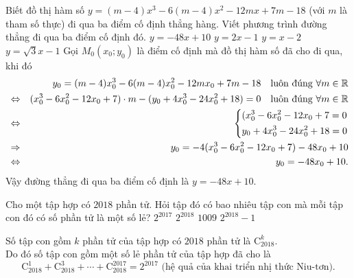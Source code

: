 \begin{ex}%
	Biết đồ thị hàm số $y=(m-4)x^3-6(m-4)x^2-12mx+7m-18$ (với $m$ là tham số thực) đi qua ba điểm cố định thẳng hàng. Viết phương trình đường thẳng đi qua ba điểm cố định đó.
	\choice
	{\True$y=-48x+10$}
	{$y=2x-1$}
	{$y=x-2$}
	{$y=\sqrt{3}x-1$}
	\loigiai
	{Gọi $M_0(x_0;y_0)$ là điểm cố định mà đồ thị hàm số đã cho đi qua, khi đó
		\begin{eqnarray*}
			& & y_0 =(m-4)x_0^3-6(m-4)x_0^2-12mx_0+7m-18 \quad \text{luôn đúng }  \forall m \in \mathbb{R}  \\
			&\Leftrightarrow & (x_0^3-6x_0^2-12x_0+7)\cdot m -(y_0 +4x_0^3-24x_0^2+18)=0 \quad \text{luôn đúng }  \forall m \in \mathbb{R} \\
			&\Leftrightarrow & \left\{\begin{aligned}&(x_0^3-6x_0^2-12x_0+7=0\\& y_0 +4x_0^3-24x_0^2+18=0\end{aligned}\right. \\
			&\Rightarrow &y_0 = -4 (x_0^3-6x_0^2-12x_0+7) -48x_0 +10 \\
			&\Leftrightarrow &y_0 =-48x_0+10.
		\end{eqnarray*}
		Vậy đường thẳng đi qua ba điểm cố định là $y=-48x+10$.
	}
\end{ex}

\begin{ex}%
	Cho một tập hợp có $2018$ phần tử. Hỏi tập đó có bao nhiêu tập con mà mỗi tập con đó có số phần tử là một số lẻ?
	\choice
	{\True $2^{2017}$}
	{$2^{2018}$}
	{$1009$}
	{$2^{2018}-1$}
	\loigiai
	{ Số tập con gồm $k$ phần tử của tập hợp có $2018$ phần tử là  $\mathrm{C}_{2018}^k$.\\
		Do đó số tập con gồm một số lẻ phần tử của tập hợp đã cho là $$\mathrm{C}_{2018}^1+\mathrm{C}_{2018}^3+\cdots +\mathrm{C}_{2018}^{2017} =2^{2017} \, \, \text{(hệ quả của khai triển nhị thức Niu-tơn).}$$
		
	}
\end{ex}

